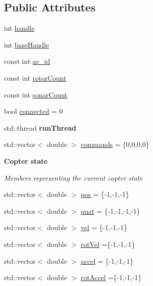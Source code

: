 \subsection*{Public Attributes}
\begin{DoxyCompactItemize}
\item 
int \hyperlink{classFinken_a96990553bc26c8bf26effe8edd6e6369}{handle}
\item 
int \hyperlink{classFinken_aef4736605ea21831e5340f66a931f8ac}{base\+Handle}
\item 
const int \hyperlink{classFinken_a496f5024f0876710ca1cfd55a2924e85}{ac\+\_\+id}
\item 
const int \hyperlink{classFinken_a2de6be70e0baaf63641df0214bf1f7a2}{rotor\+Count}
\item 
const int \hyperlink{classFinken_a92ae4d32222c44c17a4cea91055569d9}{sonar\+Count}
\item 
bool \hyperlink{classFinken_a83131e08852cbcebaffa1eef80164a6e}{connected} = 0
\item 
std\+::thread {\bfseries run\+Thread}\hypertarget{classFinken_a490f025c596b5c87d1c583124b53e34b}{}\label{classFinken_a490f025c596b5c87d1c583124b53e34b}

\item 
std\+::vector$<$ double $>$ \hyperlink{classFinken_aa4fe546d88b52ff92990bd67ced70567}{commands} = \{0,0,0,0\}
\end{DoxyCompactItemize}
\begin{Indent}{\bf Copter state}\par
{\em \label{classFinken_copterstate}%
\hypertarget{classFinken_copterstate}{}%
 Members representing the current copter state }\begin{DoxyCompactItemize}
\item 
std\+::vector$<$ double $>$ \hyperlink{classFinken_a726c0ea1d756fe0837a3f042665d8d4a}{pos} = \{-\/1,-\/1,-\/1\}
\item 
std\+::vector$<$ double $>$ \hyperlink{classFinken_a3968cbe3b6f76678367ecb61f044a221}{quat} = \{-\/1,-\/1,-\/1,-\/1\}
\item 
std\+::vector$<$ double $>$ \hyperlink{classFinken_a4dd260e6384e7cfb8040bd53fe1c2d62}{vel} = \{-\/1,-\/1,-\/1\}
\item 
std\+::vector$<$ double $>$ \hyperlink{classFinken_a518ab8ab8ac8cf54c0b79cbc1ec2075f}{rot\+Vel} =\{-\/1,-\/1,-\/1\}
\item 
std\+::vector$<$ double $>$ \hyperlink{classFinken_a6f9723479baee5573447036270a2a722}{accel} = \{-\/1,-\/1,-\/1\}
\item 
std\+::vector$<$ double $>$ \hyperlink{classFinken_ab1b738a1b691879be240b1b9488f7009}{rot\+Accel} =\{-\/1,-\/1,-\/1\}
\end{DoxyCompactItemize}
\end{Indent}



